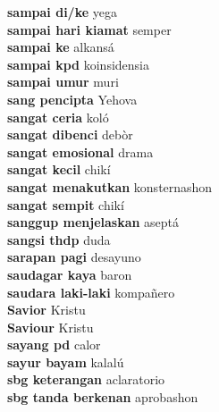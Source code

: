 \textbf{ sampai di/ke  } yega \\
\textbf{ sampai hari kiamat  } semper \\
\textbf{ sampai ke  } alkansá \\
\textbf{ sampai kpd  } koinsidensia \\
\textbf{ sampai umur  } muri \\
\textbf{ sang pencipta  } Yehova \\
\textbf{ sangat ceria  } koló \\
\textbf{ sangat dibenci  } debòr \\
\textbf{ sangat emosional  } drama \\
\textbf{ sangat kecil  } chikí \\
\textbf{ sangat menakutkan  } konsternashon \\
\textbf{ sangat sempit  } chikí \\
\textbf{ sanggup menjelaskan  } aseptá \\
\textbf{ sangsi thdp  } duda \\
\textbf{ sarapan pagi  } desayuno \\
\textbf{ saudagar kaya  } baron \\
\textbf{ saudara laki-laki  } kompañero \\
\textbf{ Savior  } Kristu \\
\textbf{ Saviour  } Kristu \\
\textbf{ sayang pd  } calor \\
\textbf{ sayur bayam  } kalalú \\
\textbf{ sbg keterangan  } aclaratorio \\
\textbf{ sbg tanda berkenan  } aprobashon \\
